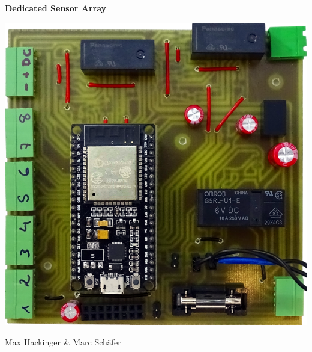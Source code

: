 %
%
\begin{titlepage}
	\begin{center}
		{\Large \bfseries Dedicated Sensor Array }
		
		\vspace{3cm}
		
		\begin{center}
			\includegraphics[width=0.5\linewidth]{../../pictures/sensorstation/small/DSC00289.png}
		\end{center}

		\vfill
		
		
		{\normalsize \newtoday } 
		
		{\normalsize Max Hackinger \& Marc Schäfer}
		
		
		
	\end{center}
	\noindent
	\begin{flushleft} 
	\end{flushleft}
\end{titlepage}